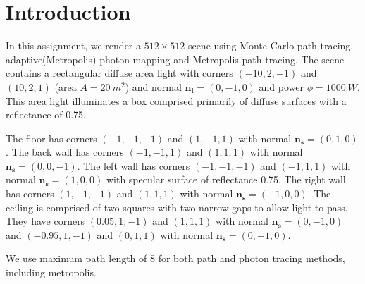 \section*{Introduction}
In this assignment, we render a $512\times 512$ scene using Monte Carlo path tracing, adaptive(Metropolis) photon mapping and Metropolis path tracing. The scene contains a rectangular diffuse area light with corners $(-10,2,-1)$ and $(10,2,1)$ (area $A=20\ m^2$) and normal $\mathbf{n_l}=(0,-1,0)$ and power $\phi=1000\ W$. This area light illuminates a box comprised primarily of diffuse surfaces with a reflectance of 0.75. 

The floor has corners $(-1,-1,-1)$ and $(1,-1,1)$ with normal $\mathbf{n_s}=(0,1,0)$. The back wall has corners $(-1,-1,1)$ and $(1,1,1)$ with normal $\mathbf{n_s}=(0,0,-1)$. The left wall has corners $(-1,-1,-1)$ and $(-1,1,1)$ with normal $\mathbf{n_s}=(1,0,0)$ with specular surface of reflectance 0.75. The right wall has corners $(1,-1,-1)$ and $(1,1,1)$ with normal $\mathbf{n_s}=(-1,0,0)$. The ceiling is comprised of two squares with two narrow gaps to allow light to pass. They have corners $(0.05,1,-1)$ and $(1,1,1)$ with normal $\mathbf{n_s}=(0,-1,0)$ and $(-0.95,1,-1)$ and $(0,1,1)$ with normal $\mathbf{n_s}=(0,-1,0)$. 

We use maximum path length of 8 for both path and photon tracing methods, including metropolis. 
